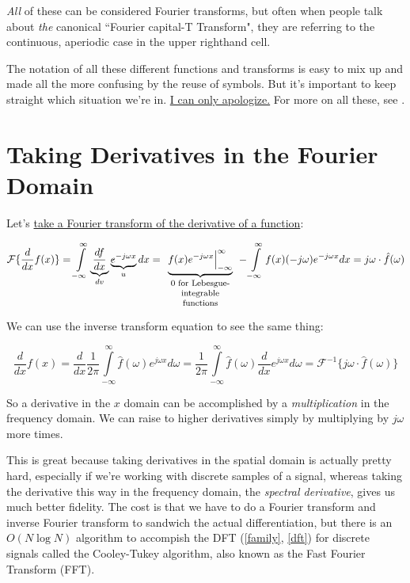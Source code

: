 \documentclass[10pt]{article}
\begin{document}
\textit{All} of these can be considered Fourier transforms, but often when people talk about \textit{the} canonical ``Fourier capital-T Transform", they are referring to the continuous, aperiodic case in the upper righthand cell.

The notation of all these different functions and transforms is easy to mix up and made all the more confusing by the reuse of symbols. But it's important to keep straight which situation we're in. \href{https://www.youtube.com/watch?v=6ITWKtTYlEI&t=69s}{I can only apologize.} For more on all these, see \cite{oppenheim}.

\section{Taking Derivatives in the Fourier Domain}\label{derivative}

Let's \href{https://www.youtube.com/watch?v=d5d0ORQHNYs}{take a Fourier transform of the derivative of a function}\cite{brunton}:

$$\mathcal{F}\{\frac{d}{dx} f(x)\} = \int\limits_{-\infty}^{\infty} \underbrace{\frac{df}{dx}}_{dv} \underbrace{e^{-j \omega x}}_{u} dx = \underbrace{f(x) e^{-j \omega x} \Big|_{-\infty}^{\infty}}_{\parbox{25mm}{\footnotesize \centering 0 for Lebesgue-integrable functions}} - \int\limits_{-\infty}^{\infty} f(x) (-j \omega) e^{-j \omega x} dx = j \omega \cdot \hat{f}(\omega)$$

We can use the inverse transform equation to see the same thing:

$$\frac{d}{dx} f(x) = \frac{d}{dx} \frac{1}{2\pi} \int\limits_{-\infty}^{\infty} \hat{f}(\omega) e^{j \omega x} d \omega = \frac{1}{2\pi} \int\limits_{-\infty}^{\infty} \hat{f}(\omega) \frac{d}{dx} e^{j \omega x} d \omega = \mathcal{F}^{-1}\{j \omega \cdot \hat{f}(\omega)\}$$

So a derivative in the $x$ domain can be accomplished by a \textit{multiplication} in the frequency domain. We can raise to higher derivatives simply by multiplying by $j \omega$ more times.

This is great because taking derivatives in the spatial domain is actually pretty hard, especially if we're working with discrete samples of a signal, whereas taking the derivative this way in the frequency domain, the \textit{spectral derivative}, gives us much better fidelity.\cite{kutz} The cost is that we have to do a Fourier transform and inverse Fourier transform to sandwich the actual differentiation, but there is an $O(N \log N)$ algorithm to accompish the DFT (\autoref{family}, \autoref{dft}) for discrete signals called the Cooley-Tukey algorithm, also known as the Fast Fourier Transform (FFT)\cite{kutz}.
\end{document}
